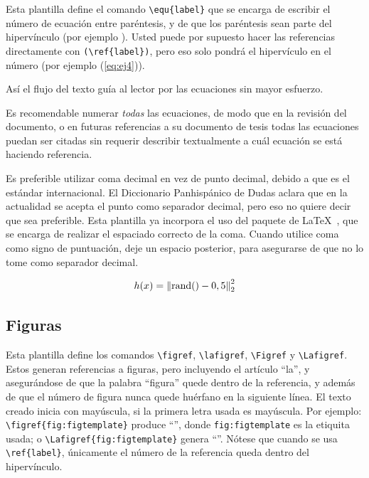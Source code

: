 Esta plantilla define el comando \verb+\equ{label}+ que se encarga de
escribir el número de ecuación entre paréntesis, y de que los
paréntesis sean parte del hipervínculo (por ejemplo ).
%
Usted puede por supuesto hacer las referencias directamente con
\verb+(\ref{label})+, pero eso solo pondrá el hipervículo en el
número (por ejemplo (\ref{eq:ej4})).

Así el flujo del texto guía al lector por las ecuaciones sin mayor esfuerzo.

Es recomendable numerar \emph{todas} las ecuaciones, de modo que en la revisión
del documento, o en futuras referencias a su documento de tesis todas las
ecuaciones puedan ser citadas sin requerir describir textualmente a cuál
ecuación se está haciendo referencia.

Es preferible utilizar coma decimal en vez de punto decimal, debido a
que es el estándar internacional.  El Diccionario Panhispánico de
Dudas aclara que en la actualidad se acepta el punto como separador
decimal, pero eso no quiere decir que sea preferible.  Esta plantilla
ya incorpora el uso del paquete de \LaTeX\ , que se
encarga de realizar el espaciado correcto de la coma.  Cuando utilice
coma como signo de puntuación, deje un espacio posterior, para
asegurarse de que  no lo tome como separador decimal.

\begin{equation}
  \label{eq:normrnd}
  h(x)=\left\lVert\operatorname{rand}()-0,5\right\rVert^2_2
\end{equation}

\subsection{Figuras}

Esta plantilla define los comandos \verb+\figref+, \verb+\lafigref+,
\verb+\Figref+ y \verb+\Lafigref+.  Estos generan referencias a
figuras, pero incluyendo el artículo ``la'', y asegurándose de que la
palabra ``figura'' quede dentro de la referencia, y además de que el
número de figura nunca quede huérfano en la siguiente línea.  El texto
creado inicia con mayúscula, si la primera letra usada es mayúscula.
Por ejemplo: \verb+\figref{fig:figtemplate}+ produce
``'', donde \verb+fig:figtemplate+ es la
etiquita usada; o \verb+\Lafigref{fig:figtemplate}+ genera
``''.  Nótese que cuando se usa
\verb+\ref{label}+, únicamente el número de la referencia queda dentro
del hipervínculo.

